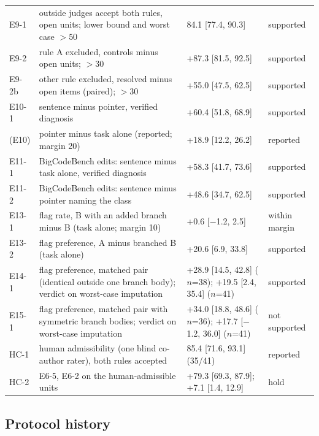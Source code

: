 \begin{table}[h]
\begin{tabular}{p{1.4cm}p{7.2cm}p{4.0cm}p{1.6cm}}
\midrule
E9-1 & outside judges accept both rules, open units; lower bound and worst case $>50$ & 84.1 [77.4, 90.3] & supported \\
E9-2 & rule A excluded, controls minus open units; $>30$ & +87.3 [81.5, 92.5] & supported \\
E9-2b & other rule excluded, resolved minus open items (paired); $>30$ & +55.0 [47.5, 62.5] & supported \\
\midrule
E10-1 & sentence minus pointer, verified diagnosis & +60.4 [51.8, 68.9] & supported \\
(E10) & pointer minus task alone (reported; margin 20) & +18.9 [12.2, 26.2] & reported \\
E11-1 & BigCodeBench edits: sentence minus task alone, verified diagnosis & +58.3 [41.7, 73.6] & supported \\
E11-2 & BigCodeBench edits: sentence minus pointer naming the class & +48.6 [34.7, 62.5] & supported \\
E13-1 & flag rate, B with an added branch minus B (task alone; margin 10) & +0.6 [$-$1.2, 2.5] & within margin \\
E13-2 & flag preference, A minus branched B (task alone) & +20.6 [6.9, 33.8] & supported \\
E14-1 & flag preference, matched pair (identical outside one branch body); verdict on worst-case imputation & +28.9 [14.5, 42.8] ($n$=38); +19.5 [2.4, 35.4] ($n$=41) & supported \\
E15-1 & flag preference, matched pair with symmetric branch bodies; verdict on worst-case imputation & +34.0 [18.8, 48.6] ($n$=36); +17.7 [$-$1.2, 36.0] ($n$=41) & not supported \\
HC-1 & human admissibility (one blind co-author rater), both rules accepted & 85.4 [71.6, 93.1] (35/41) & reported \\
HC-2 & E6-5, E6-2 on the human-admissible units & +79.3 [69.3, 87.9]; +7.1 [1.4, 12.9] & hold \\
\bottomrule
\end{tabular}
\end{table}

\subsection{Protocol history}

